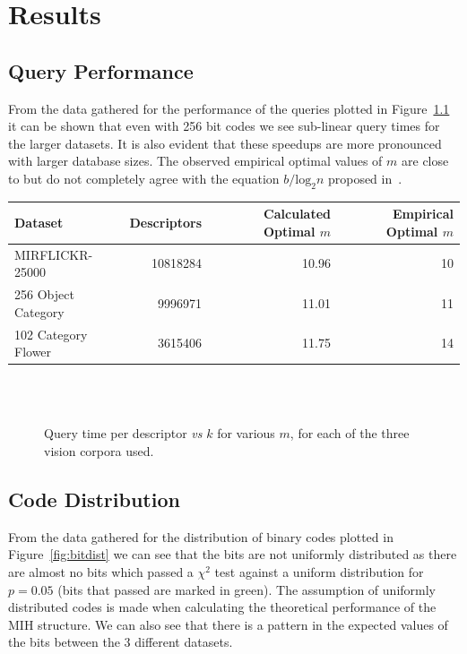 \chapter{Results}

\section{Query Performance}
From the data gathered for the performance of the queries plotted in Figure~\ref{fig:performance} it can be shown that even with 256 bit codes we see sub-linear query times for the larger datasets. It is also evident that these speedups are more pronounced with larger database sizes. The observed empirical optimal values of $m$ are close to but do not completely agree with the equation $b / \textrm{log}_2 n$ proposed in~\cite{norouzi2012fast}.

\begin{center}
\begin{tabular}{| l | r | r | r |}
\hline
\bfseries Dataset & \bfseries Descriptors & \bfseries Calculated Optimal $m$ & \bfseries Empirical Optimal $m$\\ \hline
MIRFLICKR-25000 & 10818284 & 10.96 & 10 \\ \hline
256 Object Category & 9996971 & 11.01 & 11  \\ \hline
102 Category Flower & 3615406 & 11.75 & 14 \\ \hline

\end{tabular}
\end{center}

\begin{figure}[H]
\figfont
\centering
{}\\
\\
\captionsetup{width=10cm}
\caption{Query time per descriptor \emph{vs} $k$ for various $m$, for each of the three vision corpora used.}
\label{fig:performance}
\end{figure}

\section{Code Distribution}

From the data gathered for the distribution of binary codes plotted in Figure~\ref{fig:bitdist} we can see that the bits are not uniformly distributed as there are almost no bits which passed a $\chi^2$ test against a uniform distribution for $p=0.05$ (bits that passed are marked in green). The assumption of uniformly distributed codes is made when calculating the theoretical performance of the MIH structure. We can also see that there is a pattern in the expected values of the bits between the 3 different datasets.



